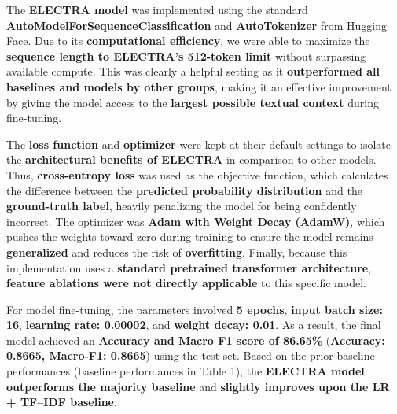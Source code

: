 The \textbf{ELECTRA model} was implemented using the standard \textbf{AutoModelForSequenceClassification} and \textbf{AutoTokenizer} from Hugging Face. Due to its \textbf{computational efficiency}, we were able to maximize the \textbf{sequence length to ELECTRA’s 512-token limit} without surpassing available compute. This was clearly a helpful setting as it \textbf{outperformed all baselines and models by other groups}, making it an effective improvement by giving the model access to the \textbf{largest possible textual context} during fine-tuning.

The \textbf{loss function} and \textbf{optimizer} were kept at their default settings to isolate the \textbf{architectural benefits of ELECTRA} in comparison to other models. Thus, \textbf{cross-entropy loss} was used as the objective function, which calculates the difference between the \textbf{predicted probability distribution} and the \textbf{ground-truth label}, heavily penalizing the model for being confidently incorrect. The optimizer was \textbf{Adam with Weight Decay (AdamW)}, which pushes the weights toward zero during training to ensure the model remains \textbf{generalized} and reduces the risk of \textbf{overfitting}. Finally, because this implementation uses a \textbf{standard pretrained transformer architecture}, \textbf{feature ablations were not directly applicable} to this specific model.

For model fine-tuning, the parameters involved \textbf{5 epochs}, \textbf{input batch size: 16}, \textbf{learning rate: 0.00002}, and \textbf{weight decay: 0.01}. As a result, the final model achieved an \textbf{Accuracy and Macro F1 score of 86.65\%} (\textbf{Accuracy: 0.8665, Macro-F1: 0.8665}) using the test set. Based on the prior baseline performances (baseline performances in Table 1), the \textbf{ELECTRA model outperforms the majority baseline} and \textbf{slightly improves upon the LR + TF--IDF baseline}.